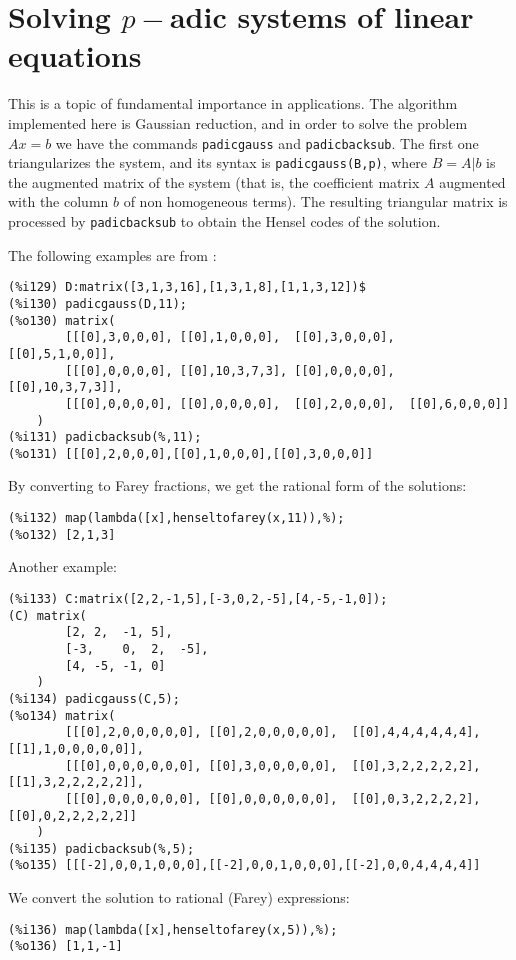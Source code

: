\documentclass[fleqn]{cas-sc}
\begin{document}
\section{Solving $p-$adic systems of linear equations}\label{sec7}

\noindent This is a topic of fundamental importance in applications. The algorithm
	implemented here is Gaussian reduction, and in order to solve the problem $Ax=b$
	we have the commands \texttt{padicgauss} and
	\texttt{padicbacksub}. The first one triangularizes the system, and its syntax
	is \texttt{padicgauss(B,p)}, where $B=A|b$ is the augmented matrix of the system
	(that is, the coefficient matrix $A$ augmented with the column $b$ of non
	homogeneous terms). The resulting triangular matrix is processed
	by \texttt{padicbacksub} to obtain the Hensel codes of the solution.

The following examples are from \cite{4}:
\begin{verbatim}
(%i129)	D:matrix([3,1,3,16],[1,3,1,8],[1,1,3,12])$
(%i130)	padicgauss(D,11);
(%o130)	matrix(
		[[[0],3,0,0,0],	[[0],1,0,0,0],	[[0],3,0,0,0],	[[0],5,1,0,0]],
		[[[0],0,0,0,0],	[[0],10,3,7,3],	[[0],0,0,0,0],	[[0],10,3,7,3]],
		[[[0],0,0,0,0],	[[0],0,0,0,0],	[[0],2,0,0,0],	[[0],6,0,0,0]]
	)
(%i131)	padicbacksub(%,11);
(%o131)	[[[0],2,0,0,0],[[0],1,0,0,0],[[0],3,0,0,0]]
\end{verbatim}

By converting to Farey fractions, we get the rational form of the solutions:

\begin{verbatim}
(%i132)	map(lambda([x],henseltofarey(x,11)),%);
(%o132)	[2,1,3]
\end{verbatim}

Another example:
\begin{verbatim}
(%i133)	C:matrix([2,2,-1,5],[-3,0,2,-5],[4,-5,-1,0]);
(C)	matrix(
		[2,	2,	-1,	5],
		[-3,	0,	2,	-5],
		[4,	-5,	-1,	0]
	)
(%i134)	padicgauss(C,5);
(%o134)	matrix(
		[[[0],2,0,0,0,0,0],	[[0],2,0,0,0,0,0],	[[0],4,4,4,4,4,4],	[[1],1,0,0,0,0,0]],
		[[[0],0,0,0,0,0,0],	[[0],3,0,0,0,0,0],	[[0],3,2,2,2,2,2],	[[1],3,2,2,2,2,2]],
		[[[0],0,0,0,0,0,0],	[[0],0,0,0,0,0,0],	[[0],0,3,2,2,2,2],	[[0],0,2,2,2,2,2]]
	)
(%i135)	padicbacksub(%,5);
(%o135)	[[[-2],0,0,1,0,0,0],[[-2],0,0,1,0,0,0],[[-2],0,0,4,4,4,4]]
\end{verbatim}

We convert the solution to rational (Farey) expressions:
\begin{verbatim}
(%i136)	map(lambda([x],henseltofarey(x,5)),%);
(%o136)	[1,1,-1]
\end{verbatim}
\end{document}
